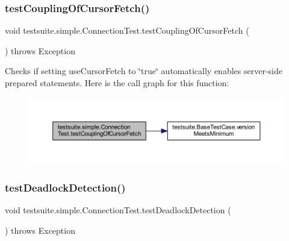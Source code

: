 \subsubsection{\texorpdfstring{test\+Coupling\+Of\+Cursor\+Fetch()}{testCouplingOfCursorFetch()}}
{\footnotesize\ttfamily void testsuite.\+simple.\+Connection\+Test.\+test\+Coupling\+Of\+Cursor\+Fetch (\begin{DoxyParamCaption}{ }\end{DoxyParamCaption}) throws Exception}

Checks if setting use\+Cursor\+Fetch to \char`\"{}true\char`\"{} automatically enables server-\/side prepared statements. Here is the call graph for this function\+:
\nopagebreak
\begin{figure}[H]
\begin{center}
\leavevmode
\includegraphics[width=350pt]{classtestsuite_1_1simple_1_1_connection_test_a64a129c95efd45055e9abf405d3eb5b1_cgraph}
\end{center}
\end{figure}
\mbox{\label{classtestsuite_1_1simple_1_1_connection_test_afeddb6540162d5a3efe572d521dcc051}} 
\subsubsection{\texorpdfstring{test\+Deadlock\+Detection()}{testDeadlockDetection()}}
{\footnotesize\ttfamily void testsuite.\+simple.\+Connection\+Test.\+test\+Deadlock\+Detection (\begin{DoxyParamCaption}{ }\end{DoxyParamCaption}) throws Exception}


